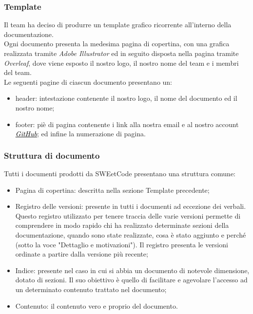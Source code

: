 \documentclass[10pt, a4paper]{article}
\begin{document}
    \subsubsection{Template}
    Il team ha deciso di produrre un template grafico ricorrente all'interno della documentazione.\\
    Ogni documento presenta la medesima pagina di copertina, con una grafica realizzata tramite \textit{Adobe Illustrator} ed in seguito disposta nella pagina tramite \textit{Overleaf}, dove viene esposto il nostro logo, il nostro nome del team e i membri del team.\\
    Le seguenti pagine di ciascun documento presentano un:
        \begin{itemize}
            \item header: intestazione contenente il nostro logo, il nome del documento ed il nostro nome;
            \item footer: piè di pagina contenente i link alla nostra email e al nostro account \href{https://sweetcode-team.github.io/}{\textcolor{black}{\textit{GitHub}}}; ed infine la numerazione di pagina.
        \end{itemize}
    \subsubsection{Struttura di documento}
    Tutti i documenti prodotti da SWEetCode presentano una struttura comune:
    \begin{itemize}
        \item Pagina di copertina: descritta nella sezione Template precedente;
        \item Registro delle versioni: presente in tutti i documenti ad eccezione dei verbali. Questo registro utilizzato per tenere traccia delle varie versioni permette di comprendere in modo rapido chi ha realizzato determinate sezioni della documentazione, quando sono state realizzate, cosa è stato aggiunto e perché (sotto la voce "Dettaglio e motivazioni"). Il registro presenta le versioni ordinate a partire dalla versione più recente; 
        \item Indice: presente nel caso in cui si abbia un documento di notevole dimensione, dotato di sezioni. Il suo obiettivo è quello di facilitare e agevolare l'accesso ad un determinato contenuto trattato nel documento;
        \item Contenuto: il contenuto vero e proprio del documento.
    \end{itemize}
\end{document}
